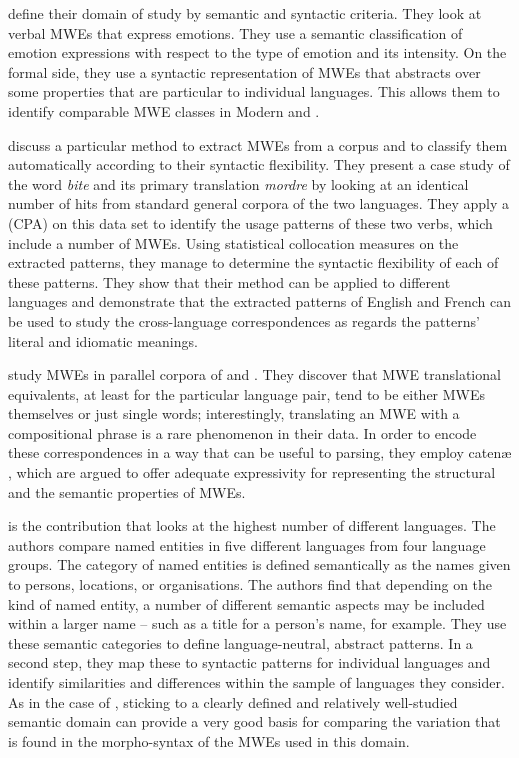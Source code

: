 \documentclass[output=paper]{langsci/langscibook}
\begin{document}
define their domain of study by semantic and syntactic criteria. They look at verbal MWEs that express emotions. They use a semantic classification of emotion expressions with respect to the type of emotion and its intensity. On the formal side, they use a syntactic representation of MWEs that abstracts over some properties that are particular to individual languages. This allows them to identify comparable MWE classes in Modern  and .  

discuss a particular method to extract MWEs from a corpus and to classify them automatically according to their syntactic flexibility. They present a case study of the  word \textit{bite} and its primary  translation \textit{mordre} by looking at an identical number of hits from standard general corpora of the two languages. They apply a  (CPA)  on this data set to identify the usage patterns of these two verbs, which include a number of MWEs. Using statistical collocation measures on the extracted patterns, they manage to determine the syntactic flexibility of each of these patterns. They show that their method can be applied to different languages and demonstrate that the extracted patterns of English and French can be used to study the cross-language correspondences as regards the patterns' literal and idiomatic meanings. 


study MWEs in parallel corpora of  and . They discover that MWE translational equivalents, at least for the particular language pair, tend to be either MWEs themselves or just single words; interestingly, translating an MWE with a compositional phrase is a rare phenomenon in their data. In order to encode these correspondences in a way that can be useful to parsing, they employ  caten\ae{} \citep{OGrady:98}, which are argued to offer adequate expressivity for representing the structural and the semantic properties of MWEs.

is the contribution that looks at the highest number of different languages. The authors compare named entities  in five different languages from four language groups. The category of named entities is defined semantically as the names given to persons, locations, or organisations. The authors find that depending on the kind of named entity, a number of different semantic aspects may be included within a larger name -- such as a title for a person’s name, for example. They use these semantic categories to define language-neutral, abstract patterns. In a second step, they map these to syntactic patterns for individual languages and identify similarities and differences within the sample of languages they consider. As in the case of , sticking to a clearly defined and relatively well-studied semantic domain can provide a very good basis for comparing the variation that is found in the morpho-syntax of the MWEs used in this domain.
\end{document}
